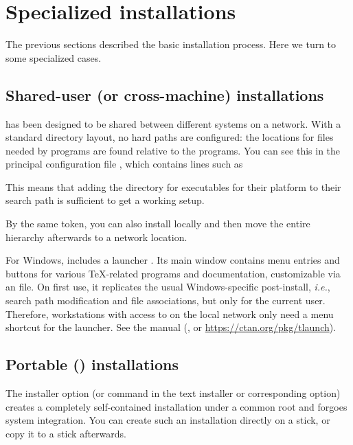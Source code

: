 \documentclass[12pt]{article}
\begin{document}
\section{Specialized installations}

The previous sections described the basic installation process.  Here we
turn to some specialized cases.

\subsection{Shared-user (or cross-machine) installations}
\label{sec:sharedinstall}

\TL{} has been designed to be shared between different systems on a
network. With a standard directory layout, no hard paths are
configured: the locations for files needed by \TL{} programs are
found relative to the programs.  You can see this in the principal
configuration file
, which contains lines such as
This means that adding the directory for \TL{} executables for their
platform to their search path is sufficient to get a working setup.

By the same token, you can also install \TL{} locally and then move
the entire hierarchy afterwards to a network location.

For Windows, \TL{} includes a launcher . Its main
window contains menu entries and buttons for various \TeX-related
programs and documentation, customizable via an  file.  On
first use, it replicates the usual Windows-specific post-install,
\emph{i.e.}, search path modification and file associations, but only
for the current user. Therefore, workstations with access to \TL{} on
the local network only need a menu shortcut for the launcher.  See the
 manual (, or
\url{https://ctan.org/pkg/tlaunch}).


\subsection{Portable (\USB{}) installations}
\label{sec:portable-tl}

The  installer option (or  command in the text
installer or corresponding \GUI{} option) creates a completely
self-contained \TL{} installation under a common root and forgoes system
integration. You can create such an installation directly on a \USB{}
stick, or copy it to a \USB{} stick afterwards.
\end{document}
